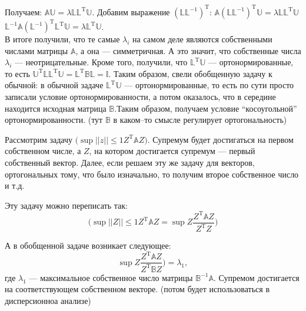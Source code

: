 Получаем: $\mathbb{A}\mathbb{U} = \lambda \mathbb{L} \mathbb{L}^{\mathrm{T}}\mathbb{U}$.
Добавим выражение $(\mathbb{L}\mathbb{L}^{-1})^{\mathrm{T}}$:
$\mathbb{A}(\mathbb{L}\mathbb{L}^{-1})^{\mathrm{T}}\mathbb{U} = \lambda \mathbb{L} \mathbb{L}^{\mathrm{T}}\mathbb{U}$\\
$\mathbb{L}^{-1} \mathbb{A}(\mathbb{L}^{-1})^{\mathrm{T}}\mathbb{L}^{\mathrm{T}}\mathbb{U} = \lambda\mathbb{L}^{\mathrm{T}}\mathbb{U}$.\\
В итоге получили, что те самые $\lambda_i$ на самом деле являются собственными числами матрицы $\mathbb{A}$, а она --- симметричная. А это значит, что собственные числа $\lambda_i$ --- неотрицательные. Кроме того, получили, что $\mathbb{L}^{\mathrm{T}}\mathbb{U}$ --- ортонормированные, то есть $\mathbb{U}^{\mathrm{T}}\mathbb{L}\mathbb{L}^{\mathrm{T}}\mathbb{U} = \mathbb{L}^{\mathrm{T}}\mathbb{B}\mathbb{L} = \mathbb{I}$. Таким образом, свели обобщенную задачу к обычной: в обычной задаче $\mathbb{L}^{\mathrm{T}}\mathbb{U}$ --- ортонормированные, то есть по сути просто записали условие ортонормированности, а потом оказалось, что в середине находится исходная матрица $\mathbb{B}$.Таким образом, получаем условие ``косоугольной'' ортонормированности. (тут $\mathbb{B}$  в каком--то смысле регулирует ортогональность)

\begin{notation}
Рассмотрим задачу $\Big (\sup \limits{||z|| \leq 1}  Z^{\mathrm{T}}\mathbb{A}Z\Big )$. Супремум будет достигаться на первом собственном числе, а $Z$, на котором достигается супремум --- первый собственный вектор. Далее, если решаем эту же задачу для векторов, ортогональных тому, что было изначально, то получим второе собственное число и т.д.
\end{notation}

Эту задачу можно переписать так:
%
\begin{equation*}
\Big (\sup \limits{||Z|| \leq 1}  Z^{\mathrm{T}}\mathbb{A}Z = \sup \limits{Z}  \frac{Z^{\mathrm{T}}\mathbb{A}Z}{Z^{\mathrm{T}}Z} \Big )
\end{equation*}
%

А в обобщенной задаче возникает следующее:
%
\begin{equation*}
\sup \limits{Z}  \frac{Z^{\mathrm{T}}\mathbb{A}Z}{Z^{\mathrm{T}}\mathbb{B}Z} \Big) = \lambda_1,
\end{equation*}
%
где $\lambda_1$ --- максимальное собственное число матрицы $\mathbb{B}^{-1}\mathbb{A}$. Супремом достигается на соответствующем собственном векторе. (потом будет использоваться в дисперсионноа анализе)

